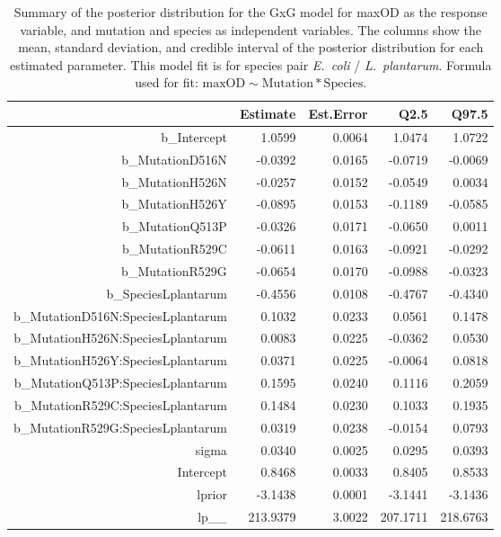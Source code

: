 \begin{table}[ht]
\centering
\begin{tabular}{rrrrr}
  \hline
 & Estimate & Est.Error & Q2.5 & Q97.5 \\ 
  \hline
b\_Intercept & 1.0599 & 0.0064 & 1.0474 & 1.0722 \\ 
  b\_MutationD516N & -0.0392 & 0.0165 & -0.0719 & -0.0069 \\ 
  b\_MutationH526N & -0.0257 & 0.0152 & -0.0549 & 0.0034 \\ 
  b\_MutationH526Y & -0.0895 & 0.0153 & -0.1189 & -0.0585 \\ 
  b\_MutationQ513P & -0.0326 & 0.0171 & -0.0650 & 0.0011 \\ 
  b\_MutationR529C & -0.0611 & 0.0163 & -0.0921 & -0.0292 \\ 
  b\_MutationR529G & -0.0654 & 0.0170 & -0.0988 & -0.0323 \\ 
  b\_SpeciesLplantarum & -0.4556 & 0.0108 & -0.4767 & -0.4340 \\ 
  b\_MutationD516N:SpeciesLplantarum & 0.1032 & 0.0233 & 0.0561 & 0.1478 \\ 
  b\_MutationH526N:SpeciesLplantarum & 0.0083 & 0.0225 & -0.0362 & 0.0530 \\ 
  b\_MutationH526Y:SpeciesLplantarum & 0.0371 & 0.0225 & -0.0064 & 0.0818 \\ 
  b\_MutationQ513P:SpeciesLplantarum & 0.1595 & 0.0240 & 0.1116 & 0.2059 \\ 
  b\_MutationR529C:SpeciesLplantarum & 0.1484 & 0.0230 & 0.1033 & 0.1935 \\ 
  b\_MutationR529G:SpeciesLplantarum & 0.0319 & 0.0238 & -0.0154 & 0.0793 \\ 
  sigma & 0.0340 & 0.0025 & 0.0295 & 0.0393 \\ 
  Intercept & 0.8468 & 0.0033 & 0.8405 & 0.8533 \\ 
  lprior & -3.1438 & 0.0001 & -3.1441 & -3.1436 \\ 
  lp\_\_ & 213.9379 & 3.0022 & 207.1711 & 218.6763 \\ 
   \hline
\end{tabular}
\caption{Summary of the posterior distribution for the GxG model for maxOD as the response variable, and mutation and species as independent variables. The columns show the mean, standard deviation, and credible interval of the posterior distribution for each estimated parameter. This model fit is for species pair \textit{E.~coli} / \textit{L.~plantarum}.  Formula used for fit: $\text{maxOD} \sim \text{Mutation} * \text{Species}$.} 
\label{supptab:GxG_maxOD_EC_LP}
\end{table}



